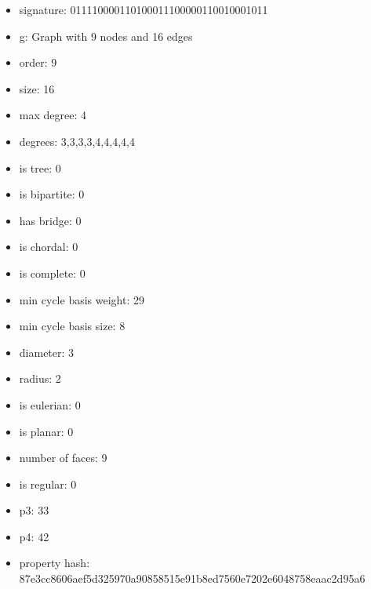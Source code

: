 \newpage
\begin{figure}
\end{figure}
\begin{itemize}
\item signature: 011110000110100011100000110010001011
\item g: Graph with 9 nodes and 16 edges
\item order: 9
\item size: 16
\item max degree: 4
\item degrees: 3,3,3,3,4,4,4,4,4
\item is tree: 0
\item is bipartite: 0
\item has bridge: 0
\item is chordal: 0
\item is complete: 0
\item min cycle basis weight: 29
\item min cycle basis size: 8
\item diameter: 3
\item radius: 2
\item is eulerian: 0
\item is planar: 0
\item number of faces: 9
\item is regular: 0
\item p3: 33
\item p4: 42
\item property hash: 87e3cc8606aef5d325970a90858515e91b8ed7560e7202e6048758eaac2d95a6
\end{itemize}
